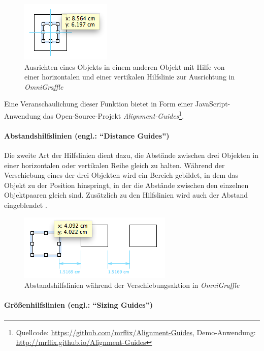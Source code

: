\begin{figure}[hbt]
    \centering
    \includegraphics{resources/omnigraffle-alignment-guides-centering.png}
    \caption{Ausrichten eines Objekts in einem anderen Objekt mit Hilfe von einer horizontalen und einer vertikalen Hilfslinie zur Ausrichtung in \textit{OmniGraffle}}
    \label{fig:omnigraffle-alignment-guides-centering}
\end{figure}

Eine Veranschaulichung dieser Funktion bietet in Form einer JavaScript-Anwendung das Open-Source-Projekt \textit{Alignment-Guides}\footnote{Quellcode: \url{https://github.com/mrflix/Alignment-Guides}, Demo-Anwendung: \url{http://mrflix.github.io/Alignment-Guides}}.

\paragraph{Abstandshilfslinien (engl.: \enquote{Distance Guides})}

Die zweite Art der Hilfslinien dient dazu, die Abstände zwischen drei Objekten in einer horizontalen oder vertikalen Reihe gleich zu halten. Während der Verschiebung eines der drei Objekten wird ein Bereich gebildet, in dem das Objekt zu der Position hinspringt, in der die Abstände zwischen den einzelnen Objektpaaren gleich sind. Zusätzlich zu den Hilfslinien wird auch der Abstand eingeblendet \cite{11Keynote, Olsen10OmniGraffle}.

\begin{figure}[hbt]
    \centering
    \includegraphics{resources/omnigraffle-distance-guides.png}
    \caption{Abstandshilfslinien während der Verschiebungsaktion in \textit{OmniGraffle}}
    \label{fig:omnigraffle-distance-guides}
\end{figure}

\paragraph{Größenhilfslinien (engl.: \enquote{Sizing Guides})}

